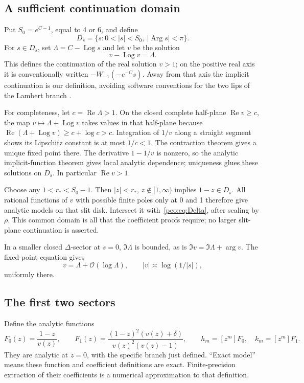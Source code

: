 \documentclass[11pt]{article}
\numberwithin{equation}{section}
\theoremstyle{remark}\newtheorem{remark}[theorem]{Remark}
\newcommand{\Oh}{\mathcal O}
\DeclareMathOperator{\Log}{Log}
\DeclareMathOperator{\Ree}{Re}
\DeclareMathOperator{\Arg}{Arg}
\begin{document}
\subsection{A sufficient continuation domain}
Put $S_0=e^{C-1}$, equal to 4 or 6, and define
\begin{equation}
 D_s=\{s:0<|s|<S_0,\ |\Arg s|<\pi\}.
 \label{peo:eq:slitdisk}
\end{equation}
For $s\in D_s$, set $\Lambda=C-\Log s$ and let $v$ be the solution
\begin{equation}
 v-\Log v=\Lambda.\label{peo:eq:Lambert}
\end{equation}
This defines the continuation of the real solution $v>1$; on the positive real axis it is conventionally written
$-W_{-1}(-e^{-C}s)$. Away from that axis the implicit continuation is our definition, avoiding software conventions for the two lips of the Lambert branch \cite[4.13]{DLMF}.

For completeness, let $c=\Ree\Lambda>1$. On the closed complete half-plane $\Ree v\ge c$, the map $v\mapsto\Lambda+\Log v$ takes values in that half-plane because
$\Ree(\Lambda+\Log v)\ge c+\log c>c$.
Integration of $1/v$ along a straight segment shows its Lipschitz constant is at most $1/c<1$. The contraction theorem gives a unique fixed point there. The derivative $1-1/v$ is nonzero, so the analytic implicit-function theorem gives local analytic dependence; uniqueness glues these solutions on $D_s$. In particular $\Ree v>1$.

Choose any $1<r_*<S_0-1$. Then $|z|<r_*$, $z\notin[1,\infty)$ implies $1-z\in D_s$. All rational functions of $v$ with possible finite poles only at 0 and 1 therefore give analytic models on that slit disk. Intersect it with~\eqref{peo:eq:Delta}, after scaling by $\rho$. This common domain is all that the coefficient proofs require; no larger slit-plane continuation is asserted.

In a smaller closed $\Delta$-sector at $s=0$, $\Im\Lambda$ is bounded, as is $\Im v=\Im\Lambda+\arg v$. The fixed-point equation gives
\begin{equation}
 v=\Lambda+\Oh(\log\Lambda),\qquad
 |v|\asymp\log(1/|s|),\label{peo:eq:vbound}
\end{equation}
uniformly there.

\subsection{The first two sectors}
Define the analytic functions
\begin{equation}
 F_0(z)=\frac{1-z}{v(z)},\qquad
 F_1(z)=\frac{(1-z)^2(v(z)+\delta)}{v(z)^2(v(z)-1)},\qquad
 h_m=[z^m]F_0,\quad k_m=[z^m]F_1.\label{peo:eq:F01}
\end{equation}
They are analytic at $z=0$, with the specific branch just defined. ``Exact model'' means these function and coefficient definitions are exact. Finite-precision extraction of their coefficients is a numerical approximation to that definition.
\end{document}
